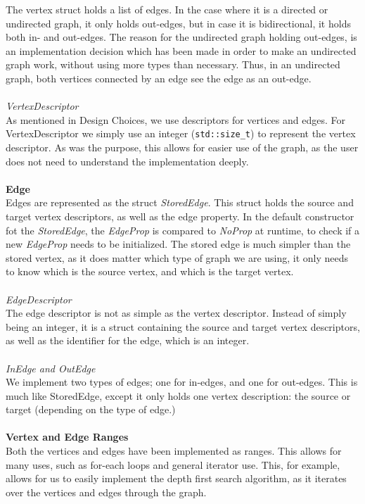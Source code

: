 \documentclass{article}
\begin{document}
The vertex struct holds a list of edges. In the case where it is a directed or undirected graph, it only holds out-edges, but in case it is bidirectional, it holds both in- and out-edges.
The reason for the undirected graph holding out-edges, is an implementation decision which has been made in order to make an undirected graph work, without using more types than necessary. 
Thus, in an undirected graph, both vertices connected by an edge see the edge as an out-edge.
\\\\
\textit{VertexDescriptor}\\
As mentioned in Design Choices, we use descriptors for vertices and edges. For VertexDescriptor we simply use an integer (\texttt{std::size\_t}) to represent the vertex descriptor. As was the purpose, this allows for easier use of the graph, as the user does not need to understand the implementation deeply.
\\\\
\noindent
\textbf{Edge}\\
Edges are represented as the struct \textit{StoredEdge}. This struct holds the source and target vertex descriptors, as well as the edge property. 
In the default constructor fot the \textit{StoredEdge}, the \textit{EdgeProp} is compared to \textit{NoProp} at runtime, to check if a new \textit{EdgeProp} needs to be initialized.
The stored edge is much simpler than the stored vertex, as it does matter which type of graph we are using, it only needs to know which is the source vertex, and which is the target vertex.
\\\\
\textit{EdgeDescriptor}\\
The edge descriptor is not as simple as the vertex descriptor. Instead of simply being an integer, it is a struct containing the source and target vertex descriptors, as well as the identifier for the edge, which is an integer.
\\\\
\textit{InEdge and OutEdge}\\
We implement two types of edges; one for in-edges, and one for out-edges. This is much like StoredEdge, except it only holds one vertex description: the source or target (depending on the type of edge.)
\\\\
\noindent
\textbf{Vertex and Edge Ranges}\\
Both the vertices and edges have been implemented as ranges. This allows for many uses, such as for-each loops and general iterator use. This, for example, allows for us to easily implement the depth first search algorithm, as it iterates over the vertices and edges through the graph.
\end{document}
